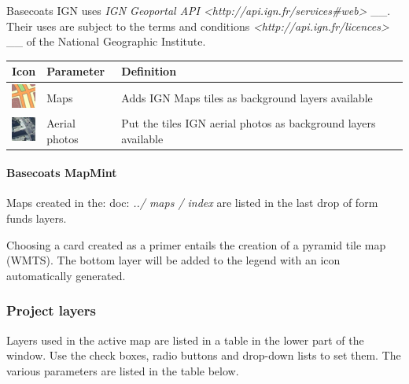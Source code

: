 \documentclass[letterpaper,10pt,english]{sphinxmanual}
\begin{document}
Basecoats IGN uses \emph{IGN Geoportal API \textless{}http://api.ign.fr/services\#web\textgreater{}} \_\_. Their uses are subject to the terms and conditions \emph{\textless{}http://api.ign.fr/licences\textgreater{}} \_\_ of the National Geographic Institute.

\begin{tabulary}{\linewidth}{|L|L|L|}
\hline

\textbf{Icon}
 & 
\textbf{Parameter}
 & 
\textbf{Definition}
\\
\hline
\includegraphics{ignm-layer-icon.png}
 & 
Maps
 & 
Adds IGN Maps tiles as background layers available
\\
\hline
\includegraphics{igns-layer-icon.png}
 & 
Aerial photos
 & 
Put the tiles IGN aerial photos as background layers available
\\
\hline\end{tabulary}

\paragraph{Basecoats MapMint}

Maps created in the: doc: \emph{../ maps / index} are listed in the last drop of form funds layers.

Choosing a card created as a primer entails the creation of a pyramid tile map (WMTS). The bottom layer will be added to the legend with an icon automatically generated.


\subsubsection{Project layers}
\label{apps/appconfig:couches-du-projet}
Layers used in the active map are listed in a table in the lower part of the window. Use the check boxes, radio buttons and drop-down lists to set them. The various parameters are listed in the table below.
\end{document}
